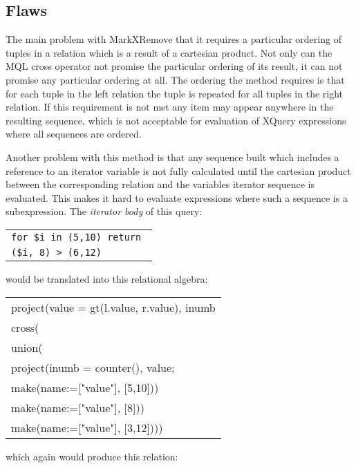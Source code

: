 \subsection{Flaws}
\label{sect:trans:mxr:flaws}
The main problem with MarkXRemove that it requires a particular ordering of
tuples in a relation which is a result of a cartesian product. Not only can the MQL \textsf{cross} operator not
promise the particular ordering of its result, it can not promise any particular ordering at all. The ordering the
method requires is that for each tuple in the left relation the tuple is repeated for all tuples in the right
relation. If this requirement is not met any item may appear anywhere in the resulting sequence, which is not
acceptable for evaluation of XQuery expressions where all sequences are ordered.

Another problem with this method is that any sequence built which includes a reference to an iterator variable is
not fully calculated until the cartesian product between the corresponding relation and the variables iterator
sequence is evaluated. This makes it hard to evaluate expressions where such a sequence is a subexpression. The
\textit{iterator body} of this query:

\begin{center}
\begin{tabular}{l}
\texttt{for \$i in (5,10) return } \\ \qquad
\texttt{(\$i, 8) > (6,12)}
\end{tabular}
\end{center}

would be translated into this relational algebra:

\begin{center}
\begin{tabular}{l}
\textsf{project(value = gt(l.value, r.value), inumb} \\ \quad
\textsf{cross(} \\ \quad\quad
\textsf{union(} \\ \quad\quad\quad
\textsf{project(inumb = counter(), value;} \\\quad\quad\quad\quad
\textsf{make(name:=["value"], [5,10]))} \\ \quad\quad\quad
\textsf{make(name:=["value"], [8]))} \\ \quad\quad
\textsf{make(name:=["value"], [3,12])))}
\end{tabular}
\end{center}

which again would produce this relation:

